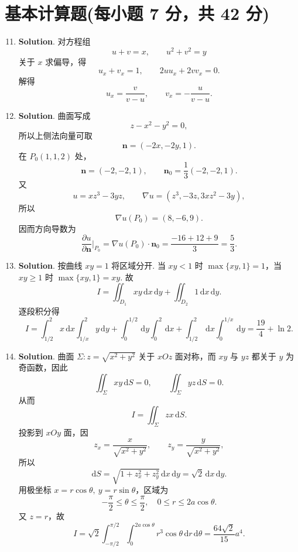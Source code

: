 \documentclass[../Main.tex]{subfiles}
\begin{document}
\section{基本计算题(每小题 7 分，共 42 分)}
\begin{enumerate}
    \setcounter{enumi}{10}
    \item \textbf{Solution}. 对方程组
          \[
              u+v=x,\qquad u^2+v^2=y
          \]
          关于 \(x\) 求偏导，得
          \[
              u_x+v_x=1,\qquad 2uu_x+2vv_x=0.
          \]
          解得
          \[
              u_x=\frac{v}{v-u},\qquad v_x=-\frac{u}{v-u}.
          \]

    \item \textbf{Solution}. 曲面写成
          \[
              z-x^2-y^2=0,
          \]
          所以上侧法向量可取
          \[
              \boldsymbol{n}=(-2x,-2y,1).
          \]
          在 \(P_0(1,1,2)\) 处，
          \[
              \boldsymbol{n}=(-2,-2,1),\qquad \boldsymbol{n}_0=\frac13(-2,-2,1).
          \]
          又
          \[
              u=xz^3-3yz,\qquad \nabla u=(z^3,-3z,3xz^2-3y),
          \]
          所以
          \[
              \nabla u(P_0)=(8,-6,9).
          \]
          因而方向导数为
          \[
              \frac{\partial u}{\partial \boldsymbol{n}}\Big|_{P_0}
              =\nabla u(P_0)\cdot \boldsymbol{n}_0
              =\frac{-16+12+9}{3}
              =\frac53.
          \]

    \item \textbf{Solution}. 按曲线 \(xy=1\) 将区域分开. 当 \(xy<1\) 时 \(\max\{xy,1\}=1\)，当 \(xy\ge 1\) 时 \(\max\{xy,1\}=xy\). 故
          \[
              I=\iint_{D_1}xy\,\mathrm{d}x\,\mathrm{d}y+\iint_{D_2}1\,\mathrm{d}x\,\mathrm{d}y.
          \]
          逐段积分得
          \[
              I=\int_{1/2}^2x\,\mathrm{d}x\int_{1/x}^2y\,\mathrm{d}y
              +\int_0^{1/2}\,\mathrm{d}y\int_0^2\,\mathrm{d}x
              +\int_{1/2}^2\,\mathrm{d}x\int_0^{1/x}\,\mathrm{d}y
              =\frac{19}{4}+\ln2.
          \]

    \item \textbf{Solution}. 曲面 \(\Sigma:z=\sqrt{x^2+y^2}\) 关于 \(xOz\) 面对称，而 \(xy\) 与 \(yz\) 都关于 \(y\) 为奇函数，因此
          \[
              \iint_\Sigma xy\,\mathrm{d}S=0,\qquad \iint_\Sigma yz\,\mathrm{d}S=0.
          \]
          从而
          \[
              I=\iint_\Sigma zx\,\mathrm{d}S.
          \]
          投影到 \(xOy\) 面，因
          \[
              z_x=\frac{x}{\sqrt{x^2+y^2}},\qquad z_y=\frac{y}{\sqrt{x^2+y^2}},
          \]
          所以
          \[
              \mathrm{d}S=\sqrt{1+z_x^2+z_y^2}\,\mathrm{d}x\,\mathrm{d}y=\sqrt2\,\mathrm{d}x\,\mathrm{d}y.
          \]
          用极坐标 \(x=r\cos\theta,\ y=r\sin\theta\)，区域为
          \[
              -\frac{\pi}{2}\le \theta\le \frac{\pi}{2},\quad 0\le r\le 2a\cos\theta.
          \]
          又 \(z=r\)，故
          \[
              I=\sqrt2\int_{-\pi/2}^{\pi/2}\int_0^{2a\cos\theta} r^3\cos\theta\,\mathrm{d}r\,\mathrm{d}\theta
              =\frac{64\sqrt2}{15}a^4.
          \]


\end{enumerate}
\end{document}
